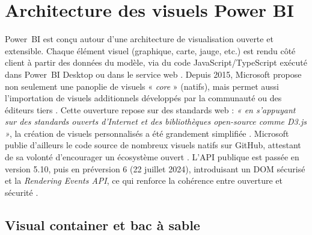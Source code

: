\section{Architecture des visuels Power BI}
\label{sec:archi-powerbi}

Power~BI est conçu autour d’une  {architecture de visualisation ouverte
et extensible}.  
Chaque élément visuel (graphique, carte, jauge, etc.) est rendu côté client
à partir des données du modèle, via du code JavaScript/TypeScript exécuté
dans Power~BI Desktop ou dans le service web \parencite{MicrosoftOpenVis2015}.  
Depuis 2015, Microsoft propose non seulement une panoplie de visuels
« \emph{core} » (natifs), mais permet aussi l’importation de visuels
additionnels développés par la communauté ou des éditeurs tiers
\parencite{MicrosoftMarketplace2016}.  
Cette ouverture repose sur des standards web : \emph{« en s’appuyant sur des
standards ouverts d’Internet et des bibliothèques open-source comme D3.js »},
la création de visuels personnalisés a été grandement simplifiée
\parencite{MicrosoftD3Blog2017}.  
Microsoft publie d’ailleurs le code source de nombreux visuels natifs sur
GitHub, attestant de sa volonté d’encourager un écosystème ouvert
\parencite{GitHubPowerBISamples2024}.  
 {L’API publique est passée en version 5.10, puis en préversion 6
(22 juillet 2024), introduisant un DOM sécurisé et la \textit{Rendering Events API}, ce qui
renforce la cohérence entre ouverture et sécurité} \parencite{MicrosoftApiChangelog2024}.

\subsection{Visual container et bac à sable}
\label{subsec:sandbox}

